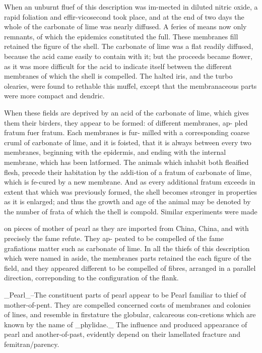 When an unburnt fluef of this description was im-mected in diluted nitric oxide, a rapid foliation and effir-vicosecond took place, and at the end of two days the whole of the carbonate of lime was nearly diffused. A feries of means now only remnants, of which the epidemics constituted the full. These membranes fill retained the figure of the shell. The carbonate of lime was a flat readily diffused, because the acid came easily to contain with it; but the proceeds became flower, as it was more difficult for the acid to indicate itself between the different membranes of which the shell is compelled. The halted iris, and the turbo olearies, were found to rethable this muffel, except that the membranaceous parts were more compact and dendric.\par\medskip
When these fields are deprived by an acid of the carbonate of lime, which gives them their birders, they appear to be formed: of different membranes, ap- pled fratum fuer fratum. Each membranes is fur- milled with a corresponding coarse cruml of carbonate of lime, and it is foisted, that it is always between every two membranes, beginning with the epidermis, and ending with the internal membrane, which has been latformed. The animals which inhabit both fleaified flesh, precede their habitation by the addi-tion of a fratum of carbonate of lime, which is fe-cured by a new membrane. And as every additional fratum exceeds in extent that which was previously formed, the shell becomes stronger in properties as it is enlarged; and thus the growth and age of the animal may be denoted by the number of frata of which the thell is compold. Similar experiments were made\par\medskip
on pieces of mother of pearl as they are imported from China, China, and with precisely the fame refute. They ap- peated to be compelled of the fame grafiations matter such as carbonate of lime. In all the thiefs of this description which were named in aside, the membranes parts retained the each figure of the field, and they appeared different to be compelled of fibres, arranged in a parallel direction, correponding to the configuration of the flank.\par\medskip
\_Pearl\_--The constituent parts of pearl appear to be Pearl familiar to thief of mother-of-pent. They are compelled concerned costs of membranes and colonies of lines, and resemble in firstature the globular, calcareous con-cretions which are known by the name of \_phylidae.\_ The influence and produced appearance of pearl and another-of-past, evidently depend on their lamellated fracture and femitran/parency.\par\medskip
